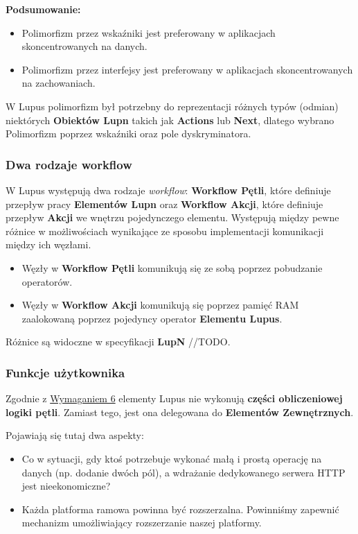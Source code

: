\textbf{Podsumowanie:}

\begin{itemize}
    \item Polimorfizm przez wskaźniki jest preferowany w aplikacjach skoncentrowanych na danych.
    \item Polimorfizm przez interfejsy jest preferowany w aplikacjach skoncentrowanych na zachowaniach.
\end{itemize}

W Lupus polimorfizm był potrzebny do reprezentacji różnych typów (odmian) niektórych \textbf{Obiektów Lupn} takich jak \textbf{Actions} lub \textbf{Next}, dlatego wybrano Polimorfizm poprzez wskaźniki oraz pole dyskryminatora.

\subsubsection{Dwa rodzaje workflow}

W Lupus występują dwa rodzaje \textit{workflow}: \textbf{Workflow Pętli}, które definiuje przepływ pracy \textbf{Elementów Lupn} oraz \textbf{Workflow Akcji}, które definiuje przepływ \textbf{Akcji} we wnętrzu pojedynczego elementu. Występują między pewne różnice w możliwościach wynikające ze sposobu implementacji komunikacji między ich węzłami.

\begin{itemize}
    \item Węzły w \textbf{Workflow Pętli} komunikują się ze sobą poprzez pobudzanie operatorów.
    \item Węzły w \textbf{Workflow Akcji} komunikują się poprzez pamięć RAM zaalokowaną poprzez pojedyncy operator \textbf{Elementu Lupus}.
\end{itemize}

Różnice są widoczne w specyfikacji \textbf{LupN} //TODO.

\subsubsection{Funkcje użytkownika}

Zgodnie z \hyperref[req:6]{Wymaganiem 6} elementy Lupus nie wykonują \textbf{części obliczeniowej logiki pętli}.  Zamiast tego, jest ona delegowana do \textbf{Elementów Zewnętrznych}.

Pojawiają się tutaj dwa aspekty:
\begin{itemize}
    \item Co w sytuacji, gdy ktoś potrzebuje wykonać małą i prostą operację na danych (np. dodanie dwóch pól), a wdrażanie dedykowanego serwera HTTP jest nieekonomiczne?
    \item Każda platforma ramowa powinna być rozszerzalna. Powinniśmy zapewnić mechanizm umożliwiający rozszerzanie naszej platformy.
\end{itemize}

